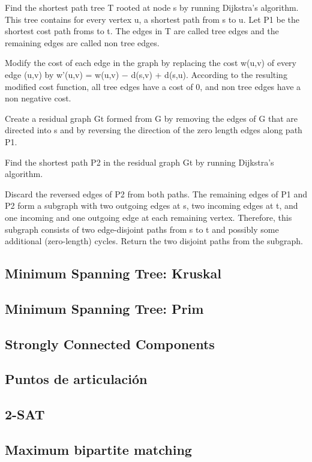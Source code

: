 \documentclass[10pt,letterpaper,twocolumn,twosided]{article}
\begin{document}
Find the shortest path tree T rooted at node s by running Dijkstra's algorithm. This tree contains for every vertex u,
a shortest path from s to u. Let P1 be the shortest cost path froms to t. The edges in T are called tree edges
and the remaining edges are called non tree edges.

Modify the cost of each edge in the graph by replacing the cost w(u,v) of every edge (u,v) 
by w'(u,v) = w(u,v) − d(s,v) + d(s,u). According to the resulting modified cost function, all tree edges have a
cost of 0, and non tree edges have a non negative cost.

Create a residual graph Gt formed from G by removing the edges of G that are directed into s and by reversing 
the direction of the zero length edges along path P1.

Find the shortest path P2 in the residual graph Gt by running Dijkstra's algorithm.

Discard the reversed edges of P2 from both paths. The remaining edges of P1 and P2 form a subgraph with two 
outgoing edges at s, two incoming edges at t, and one incoming and one outgoing edge at each remaining vertex.
Therefore, this subgraph consists of two edge-disjoint paths from s to t and possibly some additional (zero-length)
cycles. Return the two disjoint paths from the subgraph.

\subsection{Minimum Spanning Tree: Kruskal}

\subsection{Minimum Spanning Tree: Prim}

\subsection{Strongly Connected Components}

\subsection{Puntos de articulación}

\subsection{2-SAT}

\subsection{Maximum bipartite matching}
\end{document}
